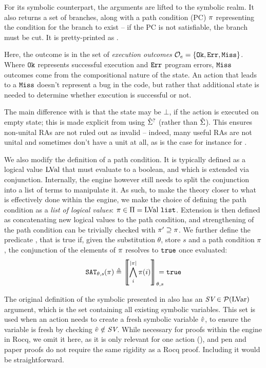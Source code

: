 For its symbolic counterpart, the arguments are lifted to the symbolic realm. It also returns a set of branches, along with a path condition (PC) $\pi$ representing the condition for the branch to exist -- if the PC is not satisfiable, the branch must be cut. It is pretty-printed as .

Here, the outcome is in the set of \emph{execution outcomes} ${\cal O}_e=\{ \texttt{Ok},\texttt{Err},\texttt{Miss} \}$. Where $\texttt{Ok}$ represents successful execution and $\texttt{Err}$ program errors, $\texttt{Miss}$ outcomes come from the compositional nature of the state. An action that leads to a $\texttt{Miss}$ doesn't represent a bug in the code, but rather that additional state is needed to determine whether execution is successful or not.

The main difference with \cite{cse2} is that the state may be $\bot$, if the action is executed on empty state; this is made explicit from using $\hat{\Sigma}^?$ (rather than $\hat{\Sigma}$). This ensures non-unital RAs are not ruled out as invalid -- indeed, many useful RAs are not unital and sometimes don't have a unit at all, as is the case for instance for \Ex.

We also modify the definition of a path condition. It is typically defined as a logical value $\text{LVal}$ that must evaluate to a boolean, and which is extended via conjunction. Internally, the engine however still needs to split the conjunction into a list of terms to manipulate it. As such, to make the theory closer to what is effectively done within the engine, we make the choice of defining the path condition as a \emph{list of logical values}: $\pi\in\Pi=\text{LVal}~\texttt{list}$. Extension is then defined as concatenating new logical values to the path condition, and strengthening of the path condition can be trivially checked with $\pi'\supseteq\pi$. We further define the predicate , that is true if, given the substitution $\theta$, store $s$ and a path condition $\pi$, the conjunction of the elements of $\pi$ resolves to $\texttt{true}$ once evaluated:
\begin{align*}
	\texttt{SAT}_{\mathit{\theta,s}}(\pi) \triangleq \left\llbracket \bigwedge_{i}^{|\pi|}\pi(i) \right\rrbracket_{\theta,s} \hspace{-1em} = \texttt{true}
\end{align*}

\begin{remark}
	The original definition of the symbolic \execac{} presented in \cite{cse2} also has an $\textit{SV}\in{\cal P}(\text{LVar})$ argument, which is the set containing all existing symbolic variables. This set is used when an action needs to create a fresh symbolic variable $\hat{v}$, to ensure the variable is fresh by checking $\hat{v}\notin \textit{SV}$. While necessary for proofs within the engine in Rocq, we omit it here, as it is only relevant for one action (\alloc), and pen and paper proofs do not require the same rigidity as a Rocq proof. Including it would be straightforward.
\end{remark}

